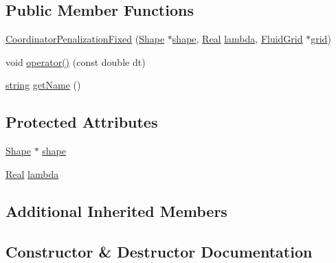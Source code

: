 \subsection*{Public Member Functions}
\begin{DoxyCompactItemize}
\item 
\hyperlink{class_coordinator_penalization_fixed_abc95008ee4fa6d71b19c590853e68ec8}{Coordinator\+Penalization\+Fixed} (\hyperlink{class_shape}{Shape} $\ast$\hyperlink{class_coordinator_penalization_fixed_a548e655ec26679bdb0f1c2d12f039f1f}{shape}, \hyperlink{_h_d_f5_dumper_8h_a445a5f0e2a34c9d97d69a3c2d1957907}{Real} \hyperlink{class_coordinator_penalization_fixed_a5e9ee0336487fa3980dbad77f51c50ba}{lambda}, \hyperlink{_definitions_8h_aff3288a3741f5098bcc456bb13440189}{Fluid\+Grid} $\ast$\hyperlink{class_generic_coordinator_aa514bbf7394bb5519c6f12daa33a375a}{grid})
\item 
void \hyperlink{class_coordinator_penalization_fixed_adb344c7e7ded7b7e8f4d948c38d0c980}{operator()} (const double dt)
\item 
\hyperlink{testfpzip_8cpp_a984bb8e04129c4268bd6ff36a50c9fa4}{string} \hyperlink{class_coordinator_penalization_fixed_a6dcdebd82a4cbc37ce47806d5f8cfa93}{get\+Name} ()
\end{DoxyCompactItemize}
\subsection*{Protected Attributes}
\begin{DoxyCompactItemize}
\item 
\hyperlink{class_shape}{Shape} $\ast$ \hyperlink{class_coordinator_penalization_fixed_a548e655ec26679bdb0f1c2d12f039f1f}{shape}
\item 
\hyperlink{_h_d_f5_dumper_8h_a445a5f0e2a34c9d97d69a3c2d1957907}{Real} \hyperlink{class_coordinator_penalization_fixed_a5e9ee0336487fa3980dbad77f51c50ba}{lambda}
\end{DoxyCompactItemize}
\subsection*{Additional Inherited Members}


\subsection{Constructor \& Destructor Documentation}
\hypertarget{class_coordinator_penalization_fixed_abc95008ee4fa6d71b19c590853e68ec8}{}
